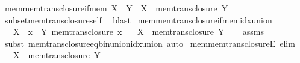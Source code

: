 \begin{isabellebody}
\endisatagproof
{\isafoldproof}%
%
\isadelimproof
\isanewline
%
\endisadelimproof
\isanewline
{}\isamarkupfalse%
\ mem{\isacharunderscore}{\kern0pt}mem{\isacharunderscore}{\kern0pt}trans{\isacharunderscore}{\kern0pt}closure{\isacharunderscore}{\kern0pt}if{\isacharunderscore}{\kern0pt}mem{\isacharcolon}{\kern0pt}\ {\isachardoublequoteopen}X\ {\isasymin}\ Y\ {\isasymLongrightarrow}\ X\ {\isasymin}\ mem{\isacharunderscore}{\kern0pt}trans{\isacharunderscore}{\kern0pt}closure\ Y{\isachardoublequoteclose}\isanewline
%
\isadelimproof
\ \ %
\endisadelimproof
%
\isatagproof
{}\isamarkupfalse%
\ subset{\isacharunderscore}{\kern0pt}mem{\isacharunderscore}{\kern0pt}trans{\isacharunderscore}{\kern0pt}closure{\isacharunderscore}{\kern0pt}self\ \isamarkupfalse%
\ blast%
\endisatagproof
{\isafoldproof}%
%
\isadelimproof
\isanewline
%
\endisadelimproof
\isanewline
{}\isamarkupfalse%
\ mem{\isacharunderscore}{\kern0pt}mem{\isacharunderscore}{\kern0pt}trans{\isacharunderscore}{\kern0pt}closure{\isacharunderscore}{\kern0pt}if{\isacharunderscore}{\kern0pt}mem{\isacharunderscore}{\kern0pt}idx{\isacharunderscore}{\kern0pt}union{\isacharcolon}{\kern0pt}\isanewline
\ \ \ {\isachardoublequoteopen}X\ {\isasymin}\ {\isacharparenleft}{\kern0pt}{\isasymUnion}x\ {\isasymin}\ Y{\isachardot}{\kern0pt}\ mem{\isacharunderscore}{\kern0pt}trans{\isacharunderscore}{\kern0pt}closure\ x{\isacharparenright}{\kern0pt}{\isachardoublequoteclose}\isanewline
\ \ \ {\isachardoublequoteopen}X\ {\isasymin}\ mem{\isacharunderscore}{\kern0pt}trans{\isacharunderscore}{\kern0pt}closure\ Y{\isachardoublequoteclose}\isanewline
%
\isadelimproof
\ \ %
\endisadelimproof
%
\isatagproof
{}\isamarkupfalse%
\ assms\ \isamarkupfalse%
\ {\isacharparenleft}{\kern0pt}subst\ mem{\isacharunderscore}{\kern0pt}trans{\isacharunderscore}{\kern0pt}closure{\isacharunderscore}{\kern0pt}eq{\isacharunderscore}{\kern0pt}bin{\isacharunderscore}{\kern0pt}union{\isacharunderscore}{\kern0pt}idx{\isacharunderscore}{\kern0pt}union{\isacharparenright}{\kern0pt}\ auto%
\endisatagproof
{\isafoldproof}%
%
\isadelimproof
\isanewline
%
\endisadelimproof
\isanewline
{}\isamarkupfalse%
\ mem{\isacharunderscore}{\kern0pt}mem{\isacharunderscore}{\kern0pt}trans{\isacharunderscore}{\kern0pt}closureE\ {\isacharbrackleft}{\kern0pt}elim{\isacharbrackright}{\kern0pt}{\isacharcolon}{\kern0pt}\isanewline
\ \ \ {\isachardoublequoteopen}X\ {\isasymin}\ mem{\isacharunderscore}{\kern0pt}trans{\isacharunderscore}{\kern0pt}closure\ Y{\isachardoublequoteclose}\isanewline

\end{isabellebody}
